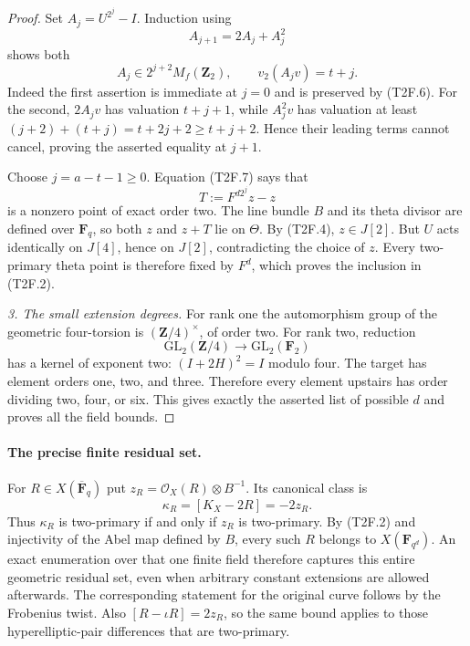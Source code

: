 \begin{proof}
Set $A_j=U^{2^j}-I$. Induction using
\[
                         A_{j+1}=2A_j+A_j^2
 \tag{T2F.6}
\]
shows both
\[
 A_j\in2^{j+2}M_f(\mathbf Z_2),\qquad
                         v_2(A_jv)=t+j.
 \tag{T2F.7}
\]
Indeed the first assertion is immediate at $j=0$ and is preserved
by (T2F.6). For the second, $2A_jv$ has valuation $t+j+1$, while
$A_j^2v$ has valuation at least
$(j+2)+(t+j)=t+2j+2\ge t+j+2$. Hence their leading terms
cannot cancel, proving the asserted equality at $j+1$.

Choose $j=a-t-1\ge0$. Equation (T2F.7) says that
\[
                    T:=F^{d2^j}z-z
 \tag{T2F.8}
\]
is a nonzero point of exact order two. The line bundle $B$ and
its theta divisor are defined over $\mathbf F_q$, so both $z$
and $z+T$ lie on $\Theta$. By (T2F.4), $z\in J[2]$. But $U$
acts identically on $J[4]$, hence on $J[2]$, contradicting the
choice of $z$. Every two-primary theta point is therefore fixed
by $F^d$, which proves the inclusion in (T2F.2).

\emph{3. The small extension degrees.}
For rank one the automorphism group of the geometric four-torsion
is $(\mathbf Z/4)^\times$, of order two. For rank two, reduction
\[
                  \mathrm{GL}_2(\mathbf Z/4)
                          \longrightarrow\mathrm{GL}_2(\mathbf F_2)
\]
has a kernel of exponent two: $(I+2H)^2=I$ modulo four.
The target has element orders one, two, and three. Therefore
every element upstairs has order dividing two, four, or six.
This gives exactly the asserted list of possible $d$ and proves
all the field bounds.
\end{proof}

\paragraph{The precise finite residual set.}
For $R\in X(\overline{\mathbf F}_q)$ put
$z_R=\mathcal O_X(R)\otimes B^{-1}$. Its canonical class is
\[
                    \kappa_R=[K_X-2R]=-2z_R.
 \tag{T2F.9}
\]
Thus $\kappa_R$ is two-primary if and only if $z_R$ is
two-primary. By (T2F.2) and injectivity of the Abel map defined
by $B$, every such $R$ belongs to $X(\mathbf F_{q^d})$.
An exact enumeration over that one finite field therefore
captures this entire geometric residual set, even when arbitrary
constant extensions are allowed afterwards. The corresponding
statement for the original curve follows by the Frobenius twist.
Also $[R-\iota R]=2z_R$, so the same bound applies to those
hyperelliptic-pair differences that are two-primary.

